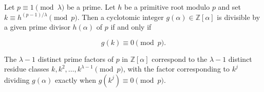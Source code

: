 Let $p \equiv 1 \pmod{\lambda}$ be a prime. Let $h$ be a primitive root modulo $p$ and set $k \equiv h^{(p-1)/\lambda} \pmod{p}$. Then a cyclotomic integer $g(\alpha) \in \mathbb{Z}[\alpha]$ is divisible by a given prime divisor $h(\alpha)$ of $p$ if and only if

$$
g(k) \equiv 0 \pmod{p}.
$$

The $\lambda-1$ distinct prime factors of $p$ in $\mathbb{Z}[\alpha]$ correspond to the $\lambda-1$ distinct residue classes $k, k^2, \ldots, k^{\lambda-1} \pmod{p}$, with the factor corresponding to $k^j$ dividing $g(\alpha)$ exactly when $g(k^j) \equiv 0 \pmod{p}$.
